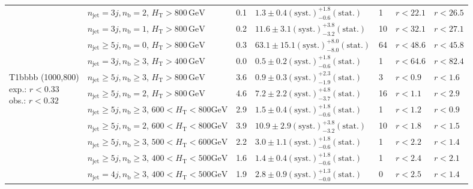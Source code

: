 \begin{table}[h!]
\begin{tabular}{ lllllll }
 & $n_{\mathrm{jet}} =3j,n_{\mathrm{b}} =2$, $H_{\mathrm{T}} > 800 \, \mathrm{GeV}$ & 0.1 & $1.3 \pm 0.4 \mathrm{(syst.)} ^{+1.8}_{-0.6} \mathrm{(stat.)}$ & 1 & $r < 22.1$ & $r < 26.5$\\ 
 & $n_{\mathrm{jet}} =3j,n_{\mathrm{b}} =1$, $H_{\mathrm{T}} > 800 \, \mathrm{GeV}$ & 0.2 & $11.6 \pm 3.1 \mathrm{(syst.)} ^{+3.8}_{-3.2} \mathrm{(stat.)}$ & 10 & $r < 32.1$ & $r < 27.1$\\ 
 & $n_{\mathrm{jet}} \geq5j,n_{\mathrm{b}} =0$, $H_{\mathrm{T}} > 800 \, \mathrm{GeV}$ & 0.3 & $63.1 \pm 15.1 \mathrm{(syst.)} ^{+8.0}_{-8.0} \mathrm{(stat.)}$ & 64 & $r < 48.6$ & $r < 45.8$\\ 
 & $n_{\mathrm{jet}} =3j,n_{\mathrm{b}} \geq3$, $H_{\mathrm{T}} > 400 \, \mathrm{GeV}$ & 0.0 & $0.5 \pm 0.2 \mathrm{(syst.)} ^{+1.8}_{-0.6} \mathrm{(stat.)}$ & 1 & $r < 64.6$ & $r < 82.4$\\ \hline
\multirow{10}{*}{\parbox[t]{2cm}{T1bbbb (1000,800)\\exp.: $r<0.33$\\obs.: $r<0.32$}}
 & $n_{\mathrm{jet}} \geq5j,n_{\mathrm{b}} \geq3$, $H_{\mathrm{T}} > 800 \, \mathrm{GeV}$ & 3.6 & $0.9 \pm 0.3 \mathrm{(syst.)} ^{+2.3}_{-1.9} \mathrm{(stat.)}$ & 3 & $r < 0.9$ & $r < 1.6$\\ 
 & $n_{\mathrm{jet}} \geq5j,n_{\mathrm{b}} =2$, $H_{\mathrm{T}} > 800 \, \mathrm{GeV}$ & 4.6 & $7.2 \pm 2.2 \mathrm{(syst.)} ^{+4.8}_{-3.7} \mathrm{(stat.)}$ & 16 & $r < 1.1$ & $r < 2.9$\\ 
 & $n_{\mathrm{jet}} \geq5j,n_{\mathrm{b}} \geq3$, $600 < H_{\mathrm{T}} < 800 \mathrm{GeV}$ & 2.9 & $1.5 \pm 0.4 \mathrm{(syst.)} ^{+1.8}_{-0.6} \mathrm{(stat.)}$ & 1 & $r < 1.2$ & $r < 0.9$\\ 
 & $n_{\mathrm{jet}} \geq5j,n_{\mathrm{b}} =2$, $600 < H_{\mathrm{T}} < 800 \mathrm{GeV}$ & 3.9 & $10.9 \pm 2.9 \mathrm{(syst.)} ^{+3.8}_{-3.2} \mathrm{(stat.)}$ & 10 & $r < 1.8$ & $r < 1.5$\\ 
 & $n_{\mathrm{jet}} \geq5j,n_{\mathrm{b}} \geq3$, $500 < H_{\mathrm{T}} < 600 \mathrm{GeV}$ & 2.2 & $3.0 \pm 1.1 \mathrm{(syst.)} ^{+1.8}_{-0.6} \mathrm{(stat.)}$ & 1 & $r < 2.2$ & $r < 1.4$\\ 
 & $n_{\mathrm{jet}} \geq5j,n_{\mathrm{b}} \geq3$, $400 < H_{\mathrm{T}} < 500 \mathrm{GeV}$ & 1.6 & $1.4 \pm 0.4 \mathrm{(syst.)} ^{+1.8}_{-0.6} \mathrm{(stat.)}$ & 1 & $r < 2.4$ & $r < 2.1$\\ 
 & $n_{\mathrm{jet}} =4j,n_{\mathrm{b}} \geq3$, $400 < H_{\mathrm{T}} < 500 \mathrm{GeV}$ & 1.9 & $2.8 \pm 0.9 \mathrm{(syst.)} ^{+1.3}_{-0.0} \mathrm{(stat.)}$ & 0 & $r < 2.5$ & $r < 1.4$\\ 

\end{tabular}
\end{table}
